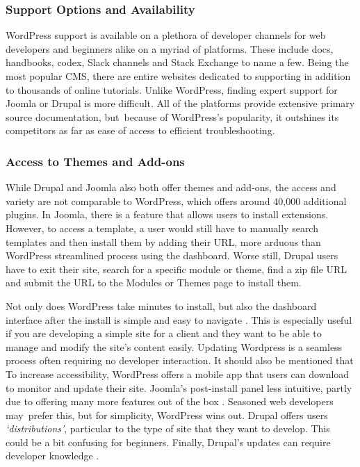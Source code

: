 \documentclass[fontsize=11pt]{extarticle}
\numberwithin{figure}{section} %
\numberwithin{table}{section}%
\begin{document}
\hypertarget{support-options-and-availability}{%
\subsubsection{Support Options and
Availability~}\label{support-options-and-availability}}

WordPress support is available on a plethora of developer channels for
web developers and beginners alike on a myriad of platforms. These
include docs, handbooks, codex, Slack channels and Stack Exchange to
name a few. Being the most popular CMS, there are entire websites
dedicated to supporting in addition to thousands of online tutorials.
Unlike WordPress, finding expert support for Joomla or Drupal is more
difficult. All of the platforms provide extensive primary source
documentation, but~because of WordPress's popularity, it outshines its
competitors as far as ease of access to efficient troubleshooting.~

\hypertarget{access-to-themes-and-add-ons}{%
\subsubsection{Access to Themes and
Add-ons~}\label{access-to-themes-and-add-ons}}

While Drupal and Joomla also both offer themes and add-ons, the access
and variety are not comparable to WordPress, which offers around 40,000
additional plugins. In Joomla, there is a feature that allows users to
install extensions. However, to access a template, a user would still
have to manually search templates and then install them by adding their
URL, more arduous than WordPress streamlined process using the
dashboard. Worse still, Drupal users have to exit their site, search for
a specific module or theme, find a zip file URL and submit the URL to
the Modules or Themes page to install them.~

Not only does WordPress take minutes to install, but also the dashboard
interface after the install is simple and easy to navigate \cite{p3}.
This is especially useful if you are developing a simple site for a
client and they want to be able to manage and modify the site's content
easily. Updating Wordpress is a seamless process often requiring no
developer interaction. It should also be mentioned that To increase
accessibility, WordPress offers a mobile app that users can download to
monitor and update their site. Joomla's post-install panel less
intuitive, partly due to offering many more features out of the box
\cite{p2}. Seasoned web developers may~prefer this, but for simplicity,
WordPress wins out. Drupal offers users \emph{`distributions'},
particular to the type of site that they want to develop. This could be
a bit confusing for beginners. Finally, Drupal's updates can require
developer knowledge \cite{p4}.
\end{document}
